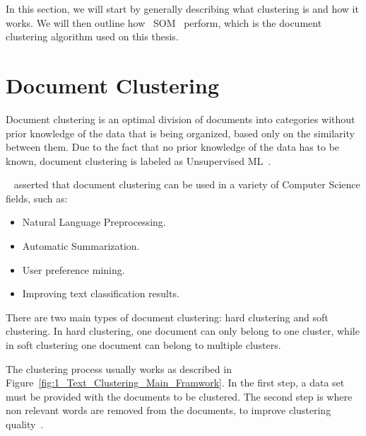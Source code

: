 \label{ch:back}

In this section, we will start by generally describing what clustering is and how it works. We will then outline how ~\ac{SOM}~\cite{Kohonen1990} perform, which is the document clustering algorithm used on this thesis.

\section{Document Clustering}
\label{sec:clustering}
Document clustering is an optimal division of documents into categories without prior knowledge of the data that is being organized, based only on the similarity between them. Due to the fact that no prior knowledge of the data has to be known, document clustering is labeled as Unsupervised \ac{ML}~\cite{hinton1999unsupervised}.

~\citet{Liu2012b} asserted that document clustering can be used in a variety of Computer Science fields, such as:
\begin{itemize}
  \item Natural Language Preprocessing.
  \item Automatic Summarization.
  \item User preference mining.
  \item Improving text classification results.
\end{itemize}

There are two main types of document clustering: hard clustering and soft clustering. In hard clustering, one document can only belong to one cluster, while in soft clustering one document can belong to multiple clusters. 


The clustering process usually works as described in Figure~\ref{fig:1_Text_Clustering_Main_Framwork}. In the first step, a data set must be provided with the documents to be clustered. The second step is where non relevant words are removed from the documents, to improve clustering quality~\cite{Kang2003}. 

